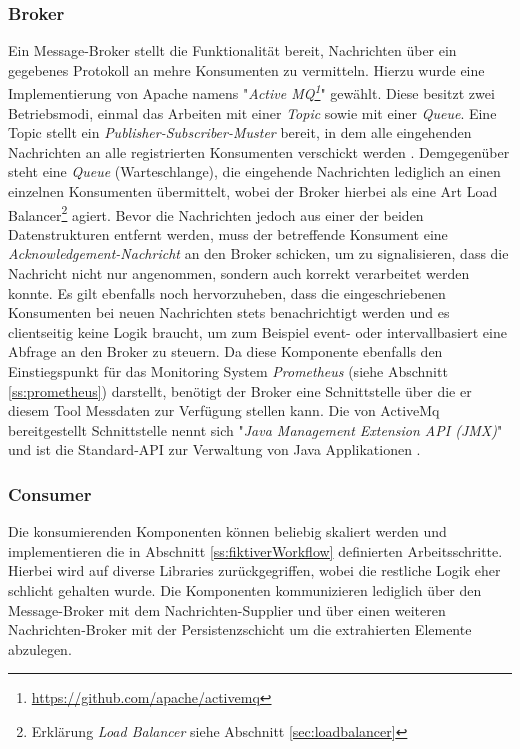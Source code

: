 \subsubsection{Broker \checkmark}
Ein Message-Broker stellt die Funktionalität bereit, Nachrichten über ein gegebenes Protokoll an mehre Konsumenten zu vermitteln. Hierzu wurde eine Implementierung von Apache namens "\emph{Active MQ\footnote{\url{https://github.com/apache/activemq}}}" gewählt. Diese besitzt zwei Betriebsmodi, einmal das Arbeiten mit einer \emph{Topic} sowie mit einer \emph{Queue}. Eine Topic stellt ein \emph{Publisher-Subscriber-Muster} bereit, in dem alle eingehenden Nachrichten an alle registrierten Konsumenten verschickt werden \cite[Seite~33 ff.]{activemq-snyder}. Demgegenüber steht eine \emph{Queue} (Warteschlange), die eingehende Nachrichten lediglich an einen einzelnen Konsumenten übermittelt, wobei der Broker hierbei als eine Art Load Balancer\footnote{Erklärung \emph{Load Balancer} siehe Abschnitt \ref{sec:loadbalancer}} agiert. Bevor die Nachrichten jedoch aus einer der beiden Datenstrukturen entfernt werden, muss der betreffende Konsument eine \emph{Acknowledgement-Nachricht} an den Broker schicken, um zu signalisieren, dass die Nachricht nicht nur angenommen, sondern auch korrekt verarbeitet werden konnte. Es gilt ebenfalls noch hervorzuheben, dass die eingeschriebenen Konsumenten bei neuen Nachrichten stets benachrichtigt werden und es clientseitig keine Logik braucht, um zum Beispiel event- oder intervallbasiert eine Abfrage an den Broker zu steuern. Da diese Komponente ebenfalls den Einstiegspunkt für das Monitoring System \emph{Prometheus} (siehe Abschnitt \ref{ss:prometheus}) darstellt, benötigt der Broker eine Schnittstelle über die er diesem Tool Messdaten zur Verfügung stellen kann. Die von ActiveMq bereitgestellt Schnittstelle nennt sich "\emph{Java Management Extension API (JMX)}" und ist die Standard-API zur Verwaltung von Java Applikationen \cite[Seite~331 ff.]{activemq-snyder}.


\subsubsection{Consumer \checkmark}
Die konsumierenden Komponenten können beliebig skaliert werden und implementieren die in Abschnitt \ref{ss:fiktiverWorkflow} definierten Arbeitsschritte. Hierbei wird auf diverse Libraries zurückgegriffen, wobei die restliche Logik eher schlicht gehalten wurde. Die Komponenten kommunizieren lediglich über den Message-Broker mit dem Nachrichten-Supplier und über einen weiteren Nachrichten-Broker mit der Persistenzschicht um die extrahierten Elemente abzulegen.


